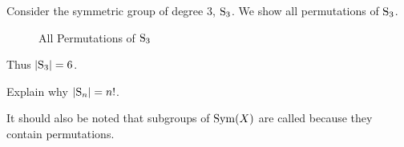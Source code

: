 \begin{example}\label{example-symmetric-group-of-degree-3}
    Consider the symmetric group of degree 3, $\mathrm{S}_{3}$. We show all permutations of $\mathrm{S}_{3}$.

    \begin{figure}[h]
        \centering
        \caption{All Permutations of $\mathrm{S}_{3}$}
    \end{figure}

    Thus $|\mathrm{S}_{3}| = 6$.
\end{example}
\begin{exercise}\label{exercise-order-of-Sn}
    Explain why $|\mathrm{S}_{n}| = n!$.
\end{exercise}

It should also be noted that subgroups of $\mathrm{Sym}(X)$ are called  because they contain permutations.

